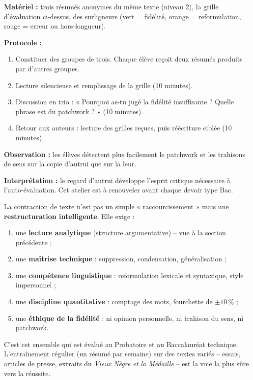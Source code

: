 \documentclass[11pt]{article}
\begin{document}
\begin{experience}
\textbf{Matériel :} trois résumés anonymes du même texte (niveau 2), la grille d'évaluation ci-dessus, des surligneurs (vert = fidélité, orange = reformulation, rouge = erreur ou hors-longueur).
\par \textbf{Protocole :}
\begin{enumerate}
    \item Constituer des groupes de trois. Chaque élève reçoit deux résumés produits par d'autres groupes.
    \item Lecture silencieuse et remplissage de la grille (10 minutes).
    \item Discussion en trio : « Pourquoi as-tu jugé la fidélité insuffisante ? Quelle phrase est du patchwork ? » (10 minutes).
    \item Retour aux auteurs : lecture des grilles reçues, puis réécriture ciblée (10 minutes).
\end{enumerate}
\textbf{Observation :} les élèves détectent plus facilement le patchwork et les trahisons de sens sur la copie d'autrui que sur la leur.
\par \textbf{Interprétation :} le regard d'autrui développe l'esprit critique nécessaire à l'auto-évaluation. Cet atelier est à renouveler avant chaque devoir type Bac.
\end{experience}

\begin{aretenir}
La contraction de texte n'est pas un simple « raccourcissement » mais une \textbf{restructuration intelligente}. Elle exige :
\begin{enumerate}
    \item une \textbf{lecture analytique} (structure argumentative) -- vue à la section précédente ;
    \item une \textbf{maîtrise technique} : suppression, condensation, généralisation ;
    \item une \textbf{compétence linguistique} : reformulation lexicale et syntaxique, style impersonnel ;
    \item une \textbf{discipline quantitative} : comptage des mots, fourchette de $\pm 10\,\%$ ;
    \item une \textbf{éthique de la fidélité} : ni opinion personnelle, ni trahison du sens, ni patchwork.
\end{enumerate}
C'est cet ensemble qui est évalué au Probatoire et au Baccalauréat technique. L'entraînement régulier (un résumé par semaine) sur des textes variés -- essais, articles de presse, extraits du \emph{Vieux Nègre et la Médaille} -- est la voie la plus sûre vers la réussite.
\end{aretenir}
\end{document}
